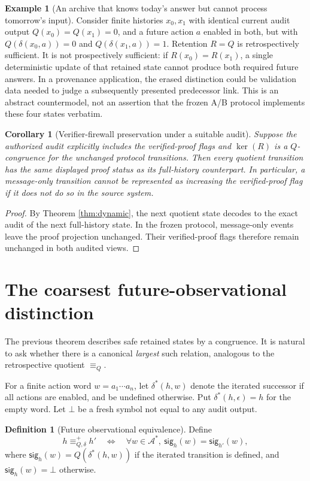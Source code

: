 \documentclass[11pt,letterpaper]{article}
\newtheorem{corollary}[theorem]{Corollary}
\theoremstyle{definition}
\newtheorem{definition}[theorem]{Definition}
\newtheorem{example}[theorem]{Example}
\newcommand{\Act}{\mathcal A}
\begin{document}
\begin{example}[An archive that knows today's answer but cannot process tomorrow's input]
Consider finite histories $x_0,x_1$ with identical current audit output $Q(x_0)=Q(x_1)=0$, and a future action $a$ enabled in both, but with $Q(\delta(x_0,a))=0$ and $Q(\delta(x_1,a))=1$. Retention $R=Q$ is retrospectively sufficient. It is not prospectively sufficient: if $R(x_0)=R(x_1)$, a single deterministic update of that retained state cannot produce both required future answers. In a provenance application, the erased distinction could be validation data needed to judge a subsequently presented predecessor link. This is an abstract countermodel, not an assertion that the frozen A/B protocol implements these four states verbatim.
\end{example}

\begin{corollary}[Verifier-firewall preservation under a suitable audit]
Suppose the authorized audit explicitly includes the verified-proof flags and $\ker(R)$ is a $Q$-congruence for the unchanged protocol transitions. Then every quotient transition has the same displayed proof status as its full-history counterpart. In particular, a message-only transition cannot be represented as increasing the verified-proof flag if it does not do so in the source system.
\end{corollary}
\begin{proof}
By Theorem \ref{thm:dynamic}, the next quotient state decodes to the exact audit of the next full-history state. In the frozen protocol, message-only events leave the proof projection unchanged. Their verified-proof flags therefore remain unchanged in both audited views.
\end{proof}

\section{The coarsest future-observational distinction}
The previous theorem describes safe retained states by a congruence. It is natural to ask whether there is a canonical \emph{largest} such relation, analogous to the retrospective quotient $\equiv_Q$.

For a finite action word $w=a_1\cdots a_n$, let $\delta^*(h,w)$ denote the iterated successor if all actions are enabled, and be undefined otherwise. Put $\delta^*(h,\epsilon)=h$ for the empty word. Let $\bot$ be a fresh symbol not equal to any audit output.
\begin{definition}[Future observational equivalence]
Define
\[
h\equiv_{Q,\delta}^{+}h'
\quad\Longleftrightarrow\quad
\forall w\in\Act^*,\ 
\mathsf{sig}_{h}(w)=\mathsf{sig}_{h'}(w),
\]
where $\mathsf{sig}_h(w)=Q(\delta^*(h,w))$ if the iterated transition is defined, and $\mathsf{sig}_h(w)=\bot$ otherwise.
\end{definition}
\end{document}
